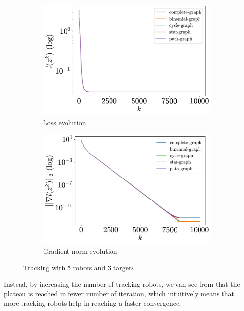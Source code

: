 \documentclass[a4paper,11pt,oneside]{book}
\begin{document}
\begin{figure}[tb!]
      \centering
      \begin{subfigure}[t]{0.46\linewidth}
            \centering
            \includegraphics[width=\linewidth]{./figs/tracking/5_3_2/loss.pdf} 
            \caption{Loss evolution}
      \end{subfigure}
      \hfill
      \begin{subfigure}[t]{0.46\linewidth}
            \centering
            \includegraphics[width=\linewidth]{./figs/tracking/5_3_2/gradient.pdf} 
            \caption{Gradient norm evolution}
      \end{subfigure}
      \caption{Tracking with $5$ robots and $3$ targets}
      \label{fig:tracking_5_3}
\end{figure}

Instead, by increasing the number of tracking robots, we can see from  that the plateau is reached in fewer number of iteration, which intuitively means that more tracking robots help in reaching a faster convergence.
\end{document}
